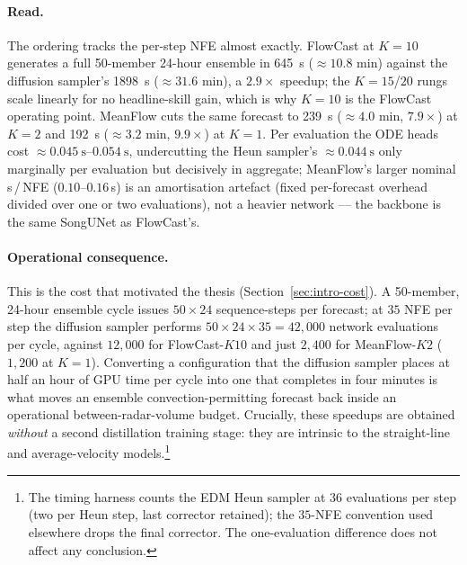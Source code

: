 \paragraph{Read.} The ordering tracks the per-step NFE almost exactly. FlowCast at $K = 10$ generates a full 50-member 24-hour ensemble in \SI{645}{\second} ($\approx 10.8$ min) against the diffusion sampler's \SI{1898}{\second} ($\approx 31.6$ min), a $2.9\times$ speedup; the $K = 15$/$20$ rungs scale linearly for no headline-skill gain, which is why $K = 10$ is the FlowCast operating point. MeanFlow cuts the same forecast to \SI{239}{\second} ($\approx 4.0$ min, $7.9\times$) at $K = 2$ and \SI{192}{\second} ($\approx 3.2$ min, $9.9\times$) at $K = 1$. Per evaluation the ODE heads cost $\approx \SI{0.045}{\second}$--$\SI{0.054}{\second}$, undercutting the Heun sampler's $\approx \SI{0.044}{\second}$ only marginally per evaluation but decisively in aggregate; MeanFlow's larger nominal s\,/\,NFE ($0.10$--$0.16$\,s) is an amortisation artefact (fixed per-forecast overhead divided over one or two evaluations), not a heavier network --- the backbone is the same SongUNet as FlowCast's.

\paragraph{Operational consequence.} This is the cost that motivated the thesis (Section~\ref{sec:intro-cost}). A 50-member, 24-hour ensemble cycle issues $50\times24$ sequence-steps per forecast; at $35$ NFE per step the diffusion sampler performs $50\times24\times35 = 42{,}000$ network evaluations per cycle, against $12{,}000$ for FlowCast-$K10$ and just $2{,}400$ for MeanFlow-$K2$ ($1{,}200$ at $K = 1$). Converting a configuration that the diffusion sampler places at half an hour of GPU time per cycle into one that completes in four minutes is what moves an ensemble convection-permitting forecast back inside an operational between-radar-volume budget. Crucially, these speedups are obtained \emph{without} a second distillation training stage: they are intrinsic to the straight-line and average-velocity models.\footnote{The timing harness counts the EDM Heun sampler at $36$ evaluations per step (two per Heun step, last corrector retained); the $35$-NFE convention used elsewhere drops the final corrector. The one-evaluation difference does not affect any conclusion.}


